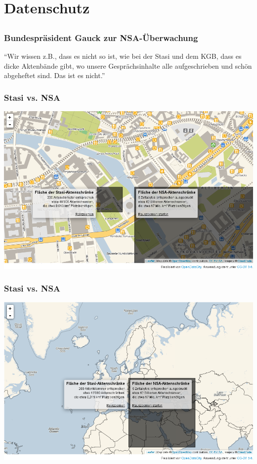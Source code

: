 \section{Datenschutz}
\subsection{}

\begin{frame}
    \frametitle{Bundespräsident Gauck zur NSA-Überwachung}
    \begin{center}
      "`Wir wissen z.B., dass es nicht so ist, wie bei der Stasi und dem KGB, dass es dicke Aktenbände gibt, wo unsere Gesprächsinhalte alle aufgeschrieben und schön abgeheftet sind. Das ist es nicht."'
      \end{center}
\end{frame}

\begin{frame}
    \frametitle{Stasi vs. NSA}
    \includegraphics[height=0.7\textheight]{img/akten1.png}
\end{frame}

\begin{frame}
    \frametitle{Stasi vs. NSA}
    \includegraphics[height=0.7\textheight]{img/akten2.png}
\end{frame}

